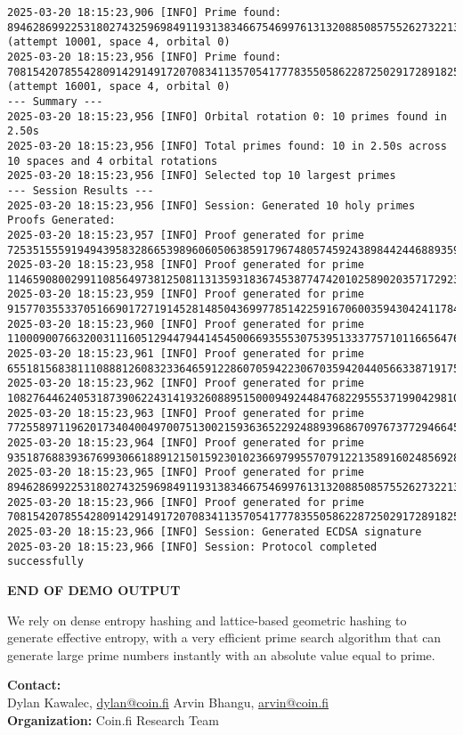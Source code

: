 \documentclass[10pt,twocolumn]{article}
\begin{document}
\begin{lstlisting}
2025-03-20 18:15:23,906 [INFO] Prime found: 89462869922531802743259698491193138346675469976131320885085755262732213889231 (attempt 10001, space 4, orbital 0)
2025-03-20 18:15:23,956 [INFO] Prime found: 70815420785542809142914917207083411357054177783550586228725029172891825716079 (attempt 16001, space 4, orbital 0)
--- Summary ---
2025-03-20 18:15:23,956 [INFO] Orbital rotation 0: 10 primes found in 2.50s
2025-03-20 18:15:23,956 [INFO] Total primes found: 10 in 2.50s across 10 spaces and 4 orbital rotations
2025-03-20 18:15:23,956 [INFO] Selected top 10 largest primes
--- Session Results ---
2025-03-20 18:15:23,956 [INFO] Session: Generated 10 holy primes
Proofs Generated:
2025-03-20 18:15:23,957 [INFO] Proof generated for prime 72535155591949439583286653989606050638591796748057459243898442446889359734351
2025-03-20 18:15:23,958 [INFO] Proof generated for prime 114659080029911085649738125081131359318367453877474201025890203571729232791779
2025-03-20 18:15:23,959 [INFO] Proof generated for prime 91577035533705166901727191452814850436997785142259167060035943042411784618011
2025-03-20 18:15:23,960 [INFO] Proof generated for prime 110009007663200311160512944794414545006693555307539513337757101166564763025363
2025-03-20 18:15:23,961 [INFO] Proof generated for prime 65518156838111088812608323364659122860705942230670359420440566338719175678611
2025-03-20 18:15:23,962 [INFO] Proof generated for prime 108276446240531873906224314193260889515000949244847682295553719904298102498283
2025-03-20 18:15:23,963 [INFO] Proof generated for prime 77255897119620173404004970075130021593636522924889396867097673772946645262731
2025-03-20 18:15:23,964 [INFO] Proof generated for prime 93518768839367699306618891215015923010236697995570791221358916024856928641679
2025-03-20 18:15:23,965 [INFO] Proof generated for prime 89462869922531802743259698491193138346675469976131320885085755262732213889231
2025-03-20 18:15:23,966 [INFO] Proof generated for prime 70815420785542809142914917207083411357054177783550586228725029172891825716079
2025-03-20 18:15:23,966 [INFO] Session: Generated ECDSA signature
2025-03-20 18:15:23,966 [INFO] Session: Protocol completed successfully
\end{lstlisting}
\textbf{END OF DEMO OUTPUT}

We rely on dense entropy hashing and lattice-based geometric hashing to generate effective entropy, with a very efficient prime search algorithm that can generate large prime numbers instantly with an absolute value equal to prime.

\begin{center}
\textbf{Contact:}\\
Dylan Kawalec, \href{mailto:dylan@coin.fi}{dylan@coin.fi} \quad\quad
Arvin Bhangu, \href{mailto:arvin@coin.fi}{arvin@coin.fi}\\[1ex]
\textbf{Organization:} Coin.fi Research Team
\end{center}
\end{document}
